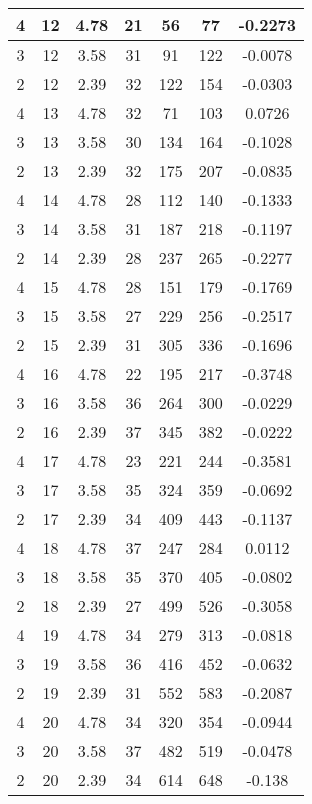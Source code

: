 \documentclass[letterpaper, 12pt]{article}
\begin{document}
\begin{longtable}{|c|c|c|c|c|c|c|}
\hline
4 & 12 & 4.78 & 21 & 56 & 77 & -0.2273 \\
\hline
3 & 12 & 3.58 & 31 & 91 & 122 & -0.0078 \\
\hline
2 & 12 & 2.39 & 32 & 122 & 154 & -0.0303 \\
\hline
4 & 13 & 4.78 & 32 & 71 & 103 & 0.0726 \\
\hline
3 & 13 & 3.58 & 30 & 134 & 164 & -0.1028 \\
\hline
2 & 13 & 2.39 & 32 & 175 & 207 & -0.0835 \\
\hline
4 & 14 & 4.78 & 28 & 112 & 140 & -0.1333 \\
\hline
3 & 14 & 3.58 & 31 & 187 & 218 & -0.1197 \\
\hline
2 & 14 & 2.39 & 28 & 237 & 265 & -0.2277 \\
\hline
4 & 15 & 4.78 & 28 & 151 & 179 & -0.1769 \\
\hline
3 & 15 & 3.58 & 27 & 229 & 256 & -0.2517 \\
\hline
2 & 15 & 2.39 & 31 & 305 & 336 & -0.1696 \\
\hline
4 & 16 & 4.78 & 22 & 195 & 217 & -0.3748 \\
\hline
3 & 16 & 3.58 & 36 & 264 & 300 & -0.0229 \\
\hline
2 & 16 & 2.39 & 37 & 345 & 382 & -0.0222 \\
\hline
4 & 17 & 4.78 & 23 & 221 & 244 & -0.3581 \\
\hline
3 & 17 & 3.58 & 35 & 324 & 359 & -0.0692 \\
\hline
2 & 17 & 2.39 & 34 & 409 & 443 & -0.1137 \\
\hline
4 & 18 & 4.78 & 37 & 247 & 284 & 0.0112 \\
\hline
3 & 18 & 3.58 & 35 & 370 & 405 & -0.0802 \\
\hline
2 & 18 & 2.39 & 27 & 499 & 526 & -0.3058 \\
\hline
4 & 19 & 4.78 & 34 & 279 & 313 & -0.0818 \\
\hline
3 & 19 & 3.58 & 36 & 416 & 452 & -0.0632 \\
\hline
2 & 19 & 2.39 & 31 & 552 & 583 & -0.2087 \\
\hline
4 & 20 & 4.78 & 34 & 320 & 354 & -0.0944 \\
\hline
3 & 20 & 3.58 & 37 & 482 & 519 & -0.0478 \\
\hline
2 & 20 & 2.39 & 34 & 614 & 648 & -0.138 \\
\hline
\end{longtable}
\end{document}
